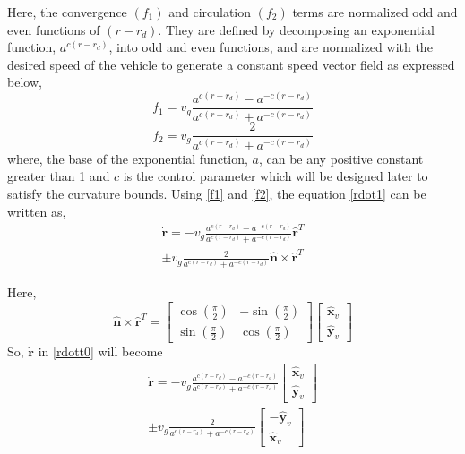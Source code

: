 \documentclass[Afour,sagev,times]{sagej}
\begin{document}
Here, the convergence $({f_1})$ and circulation $({f_2})$ terms are normalized odd and even functions of $({r-{r_d}})$. They are defined by decomposing an exponential  function, ${a^{c(r - {r_d})}}$, into odd and even functions, and are normalized with the desired speed of the vehicle to generate a constant speed vector field as expressed below,
\begin{equation}\label{f1}
{f_1} =v_{g}\frac{{{a^{c(r - {r_{d}})}} - {a^{ - c(r - {r_{d}})}}}}{{{a^{c(r - {r_{d}})}} + {a^{ - c(r - {r_{d}})}}}}
\end{equation}
\begin{equation}\label{f2}
{f_2} =v_{g}\frac{2}{{{a^{c(r - {r_d})}} + {a^{ - c(r - {r_d})}}}}
\end{equation} where, the base of the exponential function, $a$, can be any positive constant greater than 1 and $c$ is the control parameter which will be designed later to satisfy the curvature bounds. Using \eqref{f1} and \eqref{f2}, the equation \eqref{rdot1} can be written as, 
\begin{multline}\label{rdott0}
\dot{\boldsymbol{r}} =  - v_{g}\frac{{{a^{c(r - {r_d})}} - {a^{ - c(r - {r_d})}}}}{{{a^{c(r - {r_d})}} + {a^{ - c(r - {r_d})}}}}\hat{\boldsymbol{r}}^{T}\\ \pm v_{g}\frac{2}{{{a^{c(r - {r_d})}} + {a^{ - c(r - {r_d})}}}}\hat{\boldsymbol{n}} \times \hat{\boldsymbol{r}}^{T}
\end{multline}

Here,
\begin{equation}
\hat{\boldsymbol{n}} \times \hat{\boldsymbol{r}}^{T}=\begin{bmatrix}
\cos(\frac{\pi}{2}) & -\sin(\frac{\pi}{2})\\ 
\sin(\frac{\pi}{2}) & \cos(\frac{\pi}{2})
\end{bmatrix}\left[ {\begin{array}{*{20}{c}}
	\boldsymbol{\hat x}_v\\
	\boldsymbol{\hat y}_v
	\end{array}} \right] 
\end{equation}
So, $\dot{\boldsymbol{r}}$ in \eqref{rdott0} will become
\begin{multline}\label{rdott}
\dot{\boldsymbol{r}} =  - v_{g}\frac{{{a^{c(r - {r_d})}} - {a^{ - c(r - {r_d})}}}}{{{a^{c(r - {r_d})}} + {a^{ - c(r - {r_d})}}}}\left[ {\begin{array}{*{20}{c}}
	\boldsymbol{\hat x}_{v}\\
	\boldsymbol{\hat y}_{v}
	\end{array}} \right] \\ \pm v_{g}\frac{2}{{{a^{c(r - {r_d})}} + {a^{ - c(r - {r_d})}}}}\left[ {\begin{array}{*{20}{c}}
	\boldsymbol{-\hat y}_{v}\\
	\boldsymbol{\hat x}_{v}
	\end{array}} \right]
\end{multline}
\end{document}
